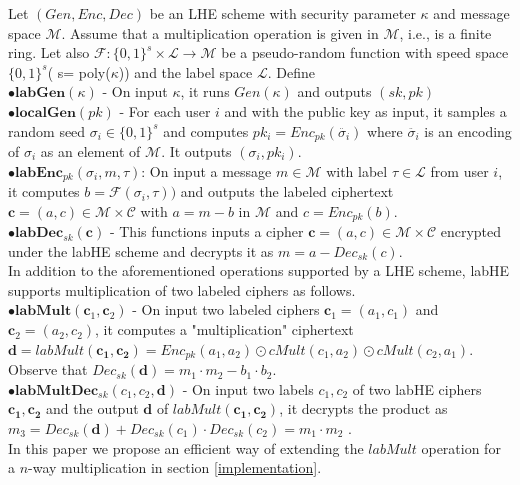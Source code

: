 Let $(Gen,Enc,Dec)$ be an \textsf{LHE} scheme with security parameter $\kappa$ and message space $\mathcal{M}$. Assume that a multiplication operation is given in $\mathcal{M}$, i.e., is a finite ring. Let also $\mathcal{F}:\{0,1\}^s \times \mathcal{L}\rightarrow \mathcal{M}$ be a pseudo-random function with speed space $\{0,1\}^s$( s= poly($\kappa $)) and the label space $\mathcal{L}$. Define
\\
 $\bullet \textbf{labGen}(\kappa)$ - On input $\kappa$, it runs $Gen(\kappa)$ and outputs $(sk,pk)$
\\$\bullet \textbf{localGen}(pk)$ -  For each user $i$ and with the public key as input, it samples a random seed $\sigma_i \in \{0,1\}^s$ and computes $pk_i = Enc_{pk}(\ddot{\sigma_i})$ where $\ddot{\sigma_i}$ is an  encoding of $\sigma_i$ as an  element of $\mathcal{M}$. It outputs $(\sigma_i,pk_i)$.\\
$\bullet \textbf{labEnc}_{pk}(\sigma_i, m , \tau)$: On input a message $m \in \mathcal{M} $ with label $\tau \in \mathcal{L}$  from user $i$, it computes $b=\mathcal{F}(\sigma_i, \tau))$ and outputs the labeled ciphertext $\mathbf{c}=(a,c) \in \mathcal{M} \times \mathcal{C}$ with $ a= m- b$ in $\mathcal{M}$ and $c=Enc_{pk}(b)$.\\
$\bullet \textbf{labDec}_{sk}(\mathbf{c})$ - This functions inputs a cipher $\mathbf{c}=(a,c) \in \mathcal{M} \times \mathcal{C}$ encrypted under the labHE scheme and decrypts it as $m=a-Dec_{sk}(c)$.
\\
In addition to the aforementioned operations supported by a \textsf{LHE}  scheme, \textsf{labHE} supports multiplication of two labeled ciphers as follows.
\\ $\bullet \textbf{labMult}(\mathbf{c}_1,\mathbf{c}_2)$ -
On input two labeled ciphers $\mathbf{c}_1=(a_1,c_1)$ and $\mathbf{c}_2=(a_2,c_2)$, it computes a "multiplication" ciphertext $\mathbf{d}=labMult(\mathbf{c_1,c_2})=Enc_{pk}(a_1,a_2)\odot cMult(c_1,a_2) \odot cMult(c_2,a_1)$. Observe that $Dec_{sk}(\mathbf{d})=m_1\cdot m_2 -b_1 \cdot b_2$.\\
 $\bullet \textbf{labMultDec}_{sk}(c_1,c_2,\mathbf{d})$ - On input two labels $c_1,c_2$ of two labHE ciphers $\mathbf{c_1},\mathbf{c_2}$ and the output $\mathbf{d}$ of $labMult(\mathbf{c_1},\mathbf{c_2})$, it decrypts the product as $m_3=Dec_{sk}(\mathbf{d})+Dec_{sk}(c_1)\cdot Dec_{sk}(c_2) = m_1\cdot m_2$ .   \\
In this paper we propose an efficient way of extending the $labMult$ operation for a $n$-way multiplication in section \ref{implementation}.


